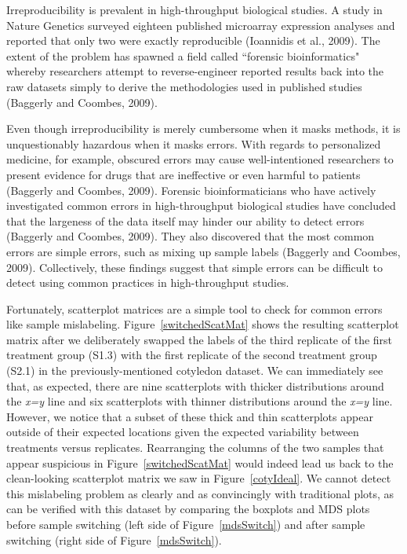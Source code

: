 \documentclass[referee]{biom}
\begin{document}
Irreproducibility is prevalent in high-throughput biological studies. A study in Nature Genetics surveyed eighteen published microarray expression analyses and reported that only two were exactly reproducible (Ioannidis et al., 2009). The extent of the problem has spawned a field called ``forensic bioinformatics" whereby researchers attempt to reverse-engineer reported results back into the raw datasets simply to derive the methodologies used in published studies (Baggerly and Coombes, 2009).

Even though irreproducibility is merely cumbersome when it masks methods, it is unquestionably hazardous when it masks errors. With regards to personalized medicine, for example, obscured errors may cause well-intentioned researchers to present evidence for drugs that are ineffective or even harmful to patients (Baggerly and Coombes, 2009). Forensic bioinformaticians who have actively investigated common errors in high-throughput biological studies have concluded that the largeness of the data itself may hinder our ability to detect errors (Baggerly and Coombes, 2009). They also discovered that the most common errors are simple errors, such as mixing up sample labels (Baggerly and Coombes, 2009). Collectively, these findings suggest that simple errors can be difficult to detect using common practices in high-throughput studies.

Fortunately, scatterplot matrices are a simple tool to check for common errors like sample mislabeling. Figure~\ref{switchedScatMat} shows the resulting scatterplot matrix after we deliberately swapped the labels of the third replicate of the first treatment group (S1.3) with the first replicate of the second treatment group (S2.1) in the previously-mentioned cotyledon dataset. We can immediately see that, as expected, there are nine scatterplots with thicker distributions around the \textit{x=y} line and six scatterplots with thinner distributions around the \textit{x=y} line. However, we notice that a subset of these thick and thin scatterplots appear outside of their expected locations given the expected variability between treatments versus replicates. Rearranging the columns of the two samples that appear suspicious in Figure~\ref{switchedScatMat} would indeed lead us back to the clean-looking scatterplot matrix we saw in Figure~\ref{cotyIdeal}. We cannot detect this mislabeling problem as clearly and as convincingly with traditional plots, as can be verified with this dataset by comparing the boxplots and MDS plots before sample switching (left side of Figure~\ref{mdsSwitch}) and after sample switching (right side of Figure~\ref{mdsSwitch}). 
\end{document}
